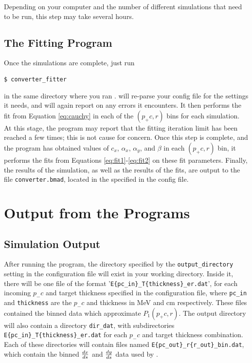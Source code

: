 \documentclass[12pt]{article}
\begin{document}
Depending on your computer and the number of different simulations that need to be run, this step may take several hours.


\subsection{The Fitting Program}

Once the simulations are complete, just run
\begin{verbatim}
$ converter_fitter
\end{verbatim}
in the same directory where you ran \exes.  \exef will re-parse your config file for the settings it
needs, and will again report on any errors it encounters.  It then performs the fit from Equation
\ref{eq:cauchy} in each of the $(p_+c, r)$ bins for each simulation.  At this stage, the program may
report that the fitting iteration limit has been reached a few times; this is not cause for concern.
Once this step is complete, and the program has obtained values of $c_x$, $\alpha_x$, $\alpha_y$,
and $\beta$ in each $(p_+c, r)$ bin, it performs the fits from Equations \ref{eq:fit1}-\ref{eq:fit2}
on these fit parameters.  Finally, the results of the simulation, as well as the results of the
fits, are output to the file \texttt{converter.bmad}, located in the \outdir specified in the config
file.

\section{Output from the Programs}

\subsection{Simulation Output}

After running the \exes program, the directory specified by the \texttt{output\_directory} setting
in the configuration file will exist in your working directory.  Inside it, there will be one file
of the format '\texttt{E\{pc\_in\}\_T\{thickness\}\_er.dat}', for each incoming $p_- c$ and target
thickness specified in the configuration file, where \texttt{pc\_in} and \texttt{thickness} are the
$p_- c$ and thickness in MeV and cm respectively.  These files contained the binned data which
approximate $P_1(p_+ c, r)$.  The output directory will also contain a directory \texttt{dir\_dat},
with subdirectories \texttt{E\{pc\_in\}\_T\{thickness\}\_er.dat} for each $p_- c$ and target
thickness combination.  Each of these directories will contain files named
\texttt{E\{pc\_out\}\_r\{r\_out\}\_bin.dat}, which contain the binned $\frac{dx}{ds}$ and $\frac{dy}{ds}$ data used
by \exef.
\end{document}
